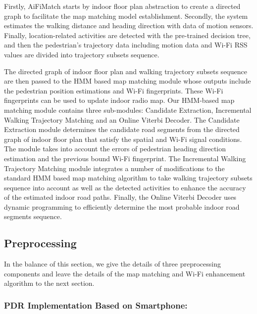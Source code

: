 \documentclass{llncs}
\begin{document}
Firstly, AiFiMatch starts by indoor floor plan abstraction to create a directed graph to facilitate the map matching model establishment. Secondly, the system estimates the walking distance and heading direction with data of motion sensors. Finally, location-related activities are detected with the pre-trained decision tree, and then the pedestrian's trajectory data including motion data and Wi-Fi RSS values are divided into trajectory subsets sequence.  

The directed graph of indoor floor plan and walking trajectory subsets sequence are then passed to the HMM based map matching module whose outputs include the pedestrian position estimations and Wi-Fi fingerprints. These Wi-Fi fingerprints can be used to update indoor radio map. Our HMM-based map matching module contains three sub-modules: Candidate Extraction, Incremental Walking Trajectory Matching and an Online Viterbi Decoder. The Candidate Extraction module determines the candidate road segments from the directed graph of indoor floor plan that satisfy the spatial and Wi-Fi signal conditions. The module takes into account the errors of pedestrian heading direction estimation and the previous bound Wi-Fi fingerprint. The Incremental Walking Trajectory Matching module integrates a number of modifications to the standard HMM based map matching algorithm to take walking trajectory subsets sequence into account as well as the detected activities to enhance the accuracy of the estimated indoor road paths. Finally, the Online Viterbi Decoder uses dynamic programming to efficiently determine the most probable indoor road segments sequence.

\subsection{Preprocessing}

In the balance of this section, we give the details of three preprocessing components and leave the details of the map matching and Wi-Fi enhancement algorithm to the next section.

\subsubsection{PDR Implementation Based on Smartphone:}
\end{document}
